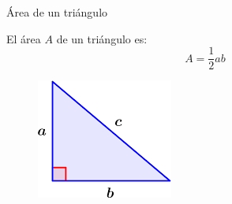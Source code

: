 \begin{infocard}{Área de un triángulo}
    \begin{minipage}{0.35\textwidth}
        El área $A$ de un triángulo es:
        \[A=\frac{1}{2}ab\]
    \end{minipage}\hfill
    \begin{minipage}{0.5\textwidth}
        \begin{figure}[H]
            \centering
            \includegraphics[width=0.5\linewidth]{../images/triangulo_perimetro.png}
            \caption{}
            \label{fig:20230402132954}
        \end{figure}
    \end{minipage}
\end{infocard}